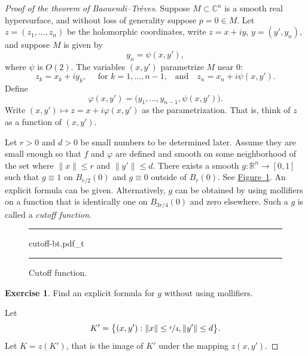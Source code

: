 \documentclass[12pt,openany]{book}
\newcommand{\snorm}[1]{\lVert {#1} \rVert}
\newcommand{\C}{{\mathbb{C}}}
\newcommand{\R}{{\mathbb{R}}}
\newcommand{\myindex}[1]{#1\index{#1}}
\theoremstyle{plain}
\theoremstyle{remark}
\theoremstyle{definition}
\newenvironment{exbox}{%
    \def\FrameCommand{\vrule width 1pt \relax\hspace{10pt}}%
    \MakeFramed{\advance\hsize-\width\FrameRestore}%
}{%
    \endMakeFramed
}
\newenvironment{myfig}{%
\begin{figure}[h!t]
\noindent\rule{\textwidth}{0.5pt}\vspace{12pt}\par\centering}%
{\par\noindent\rule{\textwidth}{0.5pt}
\end{figure}}
\theoremstyle{exercise}
\newtheorem{exercise}{Exercise}[section]
\theoremstyle{example}
\newcommand{\figureref}[1]{\hyperref[#1]{Figure~\ref*{#1}}}
\begin{document}
\begin{proof}[Proof of the theorem of Baouendi--Tr{\`e}ves]
Suppose $M \subset \C^n$ is a smooth real hypersurface, and without loss
of generality suppose $p=0 \in M$.
Let $z=(z_1,\ldots,z_n)$ be the holomorphic coordinates, write $z=x+iy$,
$y=(y',y_n)$, and
suppose $M$ is given by
\begin{equation*}
y_n = \psi(x,y') ,
\end{equation*}
where $\psi$ is $O(2)$.
The variables $(x,y')$ parametrize $M$ near $0$:
\begin{equation*}
z_k = x_k+iy_k , \quad \text{ for $k = 1,\ldots,n-1$,} \quad \text{and} \quad
z_n = x_n + i \psi(x,y') .
\end{equation*}
Define
\begin{equation*}
\varphi(x,y') = \bigl(y_1,\ldots,y_{n-1},\psi(x,y')\bigr) .
\end{equation*}
Write $(x,y') \mapsto z = x + i\varphi(x,y')$ as the parametrization.
That is, think of $z$ as a function of $(x,y')$.

Let $r > 0$ and $d > 0$ be small numbers to be determined later.
Assume they are small enough so
that $f$ and $\varphi$ are defined and smooth on some neighborhood of the
set where $\snorm{x} \leq r$ and $\snorm{y'} \leq d$.
There exists a smooth $g \colon \R^n \to [0,1]$ such that $g \equiv 1$ on
$B_{r/2}(0)$ and $g \equiv 0$ outside of $B_{r}(0)$.
See \figureref{fig:cutoff-bt}.
An explicit formula can be given.
Alternatively, $g$ can be obtained by using
mollifiers on a function that is identically one on
$B_{3r/4}(0)$ and zero elsewhere.  Such a $g$ is called a
\emph{\myindex{cutoff function}}.

\begin{myfig}
{cutoff-bt.pdf_t}
\caption{Cutoff function.\label{fig:cutoff-bt}}
\end{myfig}

\begin{exbox}
\begin{exercise}
Find an explicit formula for $g$ without using mollifiers.
\end{exercise}
\end{exbox}

Let
\begin{equation*}
K' = \bigl\{ (x,y') : \snorm{x} \leq \nicefrac{r}{4} , \snorm{y'} \leq d
\bigr\} .
\end{equation*}
Let $K = z(K')$, that is the image of $K'$ under the mapping $z(x,y')$.


\end{proof}
\end{document}

